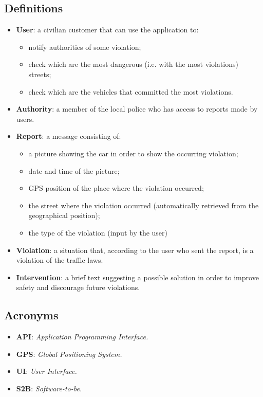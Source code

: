 \documentclass[12pt,a4paper]{report}
\begin{document}
		\subsection{Definitions}
		\begin{itemize}
		\item \textbf{User}: a civilian customer that can use the application to:
			\begin{itemize}
			\item notify authorities of some violation;
			\item check which are the most dangerous (i.e. with the most violations) streets;
			\item check which are the vehicles that committed the most violations.
			\end{itemize}
		\item \textbf{Authority}: a member of the local police who has access to reports made by users.
		\item \textbf{Report}: a message consisting of:
			\begin{itemize}
			\item a picture showing the car in order to show the occurring violation;
			\item date and time of the picture;
			\item GPS position of the place where the violation occurred;
			\item the street where the violation occurred (automatically retrieved from the geographical position);
			\item the type of the violation (input by the user)
			\end{itemize}
		\item \textbf{Violation}: a situation that, according to the user who sent the report, is a violation of the traffic laws.
		\item \textbf{Intervention}: a brief text suggesting a possible solution in order to improve safety and discourage future violations.
		\end{itemize}
		\subsection{Acronyms}
			\begin{itemize}
			\item \textbf{API}: \emph{Application Programming Interface.}
			\item \textbf{GPS}: \emph{Global Positioning System.}
			\item \textbf{UI}: \emph{User Interface.}		
			\item \textbf{S2B}: \emph{Software-to-be.}	
			\end{itemize}
\end{document}
